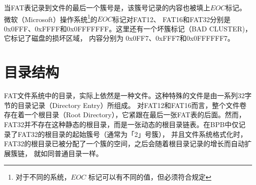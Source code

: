 当FAT表记录到文件的最后一个簇号是，该簇号记录的内容也被填上$EOC$标记。微软（Microsoft）操作系统\footnote{对于不同的系统，$EOC$
标记可以有不同的值，但必须符合规定}的$EOC$标记对FAT12、
FAT16和FAT32分别是 0x0FFF、0xFFFF和0x0FFFFFFF。这里还有一个坏簇标记（BAD CLUSTER)，它标记了磁盘的损坏区域，
内容分别为 0x0FF7、0xFFF7和0x0FFFFFF7。

\section{目录结构}    %
\label{sec:dirstruct}

FAT文件系统中的目录，实际上依然是一种文件。这种特殊的文件是由一系列32字节的目录记录（Directory Entry）所组成。
对FAT12和FAT16而言，整个文件卷存在着一个根目录（Root Directory），它紧跟在最后一张FAT表的后面。然而，
FAT32并不存在这种静态的根目录，而是一张动态的根目录链表。在BPB中仅记录了FAT32的根目录的起始簇号（通常为「2」号簇），
并且文件系统格式化时，FAT32的根目录已被分配了一个簇的空间，之后会随着根目录记录的增长而自动扩展簇链，
就如同普通目录一样。

